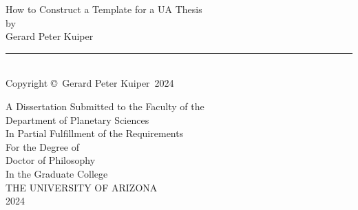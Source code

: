 \documentclass[12pt]{report} %
\newcommand{\CompleteTitle}{How to Construct a Template for a UA Thesis} %
\newcommand{\FullName}{Gerard Peter Kuiper} %
\newcommand{\DegreeType}{Doctor of Philosophy} %
\newcommand{\DepartmentName}{Department of Planetary Sciences} %
\newcommand{\DegreeYear}{2024} %
\begin{document}
\nobibliography* %



\thispagestyle{empty} %

\null
\vfill

\begin{center}
\MakeUppercase\CompleteTitle \\ 
\vspace*{1.5em}
by\\
\vspace*{1.5em}
\FullName \\
\vspace*{2em}

\rule{3in}{1pt}\\
\vspace*{-1em}
{\small Copyright \copyright\ \FullName\ \DegreeYear} \\
\vspace*{2em}

A Dissertation Submitted to the Faculty of the\\
\vspace*{1.5em}
\MakeUppercase\DepartmentName \\
\vspace*{1.5em}
In Partial Fulfillment of the Requirements\\
\vspace*{0.5em}
For the Degree of\\
\vspace*{1.5em}
\MakeUppercase\DegreeType \\
\vspace*{1.5em}
In the Graduate College\\
\vspace*{1.5em}
THE UNIVERSITY OF ARIZONA\\
\vspace*{3em}
\DegreeYear
\end{center}

\vfill %





\end{document}
